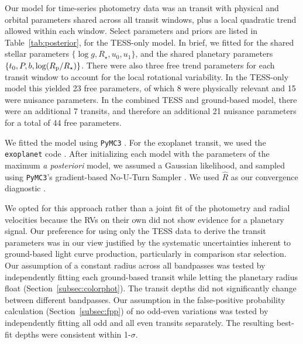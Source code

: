 \documentclass[12pt,twocolumn,tighten]{aastex63}
\begin{document}
Our model for time-series photometry data was an
\citet{exoplanet:agol20} transit with physical and orbital parameters
shared across all transit windows, plus a local quadratic trend
allowed within each window.  Select parameters and priors are listed
in Table~\ref{tab:posterior}, for the TESS-only model.  In brief, we
fitted for the shared stellar parameters $\{\log g, R_\star, u_0,
u_1\}$, and the shared planetary parameters $\{t_0, P, b, \log(R_{\rm
p}/R_\star)\}$.  There were also three free trend parameters for each
transit window to account for the local rotational variability.  In
the TESS-only model this yielded 23 free parameters, of which 8 were
physically relevant and 15 were nuisance parameters.  In the combined
TESS and ground-based model, there were an additional 7 transits, and
therefore an additional 21 nuisance parameters for a total of 44 free
parameters.

We fitted the model using \texttt{PyMC3}
\citep{salvatier_2016_PyMC3,exoplanet:theano}.  For the exoplanet
transit, we used the \texttt{exoplanet} code
\citep{exoplanet:exoplanet}.  After initializing each model with the
parameters of the maximum {\it a posteriori} model, we assumed a
Gaussian likelihood, and sampled using \texttt{PyMC3}'s gradient-based
No-U-Turn Sampler \citep{hoffman_no-u-turn_2014}. We used $\hat{R}$ as
our convergence diagnostic \citep{gelman_inference_1992}.

We opted for this approach rather than a joint fit of the photometry
and radial velocities because the RVs on their own did not show
evidence for a planetary signal.  Our preference for using only the
TESS data to derive the transit parameters was in our view justified
by the systematic uncertainties inherent to ground-based light curve
production, particularly in comparison star selection.  Our assumption
of a constant radius across all bandpasses was tested by independently
fitting each ground-based transit while letting the planetary radius
float (Section~\ref{subsec:colorphot}). The transit depths did not
significantly change between different bandpasses.
Our assumption in the false-positive probability calculation
(Section~\ref{subsec:fpp}) of no odd-even variations was tested by
independently fitting all odd and all even transits separately.
The resulting best-fit depths were consistent within 1-$\sigma$.
\end{document}
